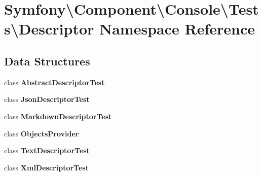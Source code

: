 \section{Symfony\textbackslash{}Component\textbackslash{}Console\textbackslash{}Tests\textbackslash{}Descriptor Namespace Reference}
\label{namespace_symfony_1_1_component_1_1_console_1_1_tests_1_1_descriptor}
\subsection*{Data Structures}
\begin{DoxyCompactItemize}
\item 
class {\bf Abstract\+Descriptor\+Test}
\item 
class {\bf Json\+Descriptor\+Test}
\item 
class {\bf Markdown\+Descriptor\+Test}
\item 
class {\bf Objects\+Provider}
\item 
class {\bf Text\+Descriptor\+Test}
\item 
class {\bf Xml\+Descriptor\+Test}
\end{DoxyCompactItemize}
